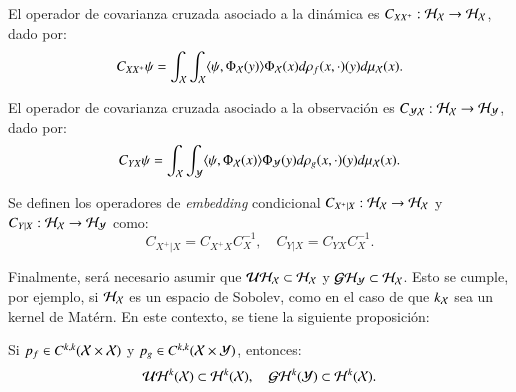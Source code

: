 \begin{defn}
    El operador de covarianza cruzada asociado a la dinámica es $C_{X X^+} : \mathcal{H}_{\mathcal{X}} \to \mathcal{H}_{\mathcal{X}}$, dado por:
	\begin{equation*}
		C_{X X^+} \psi = \int_{\mathcal{X}} \int_{\mathcal{X}} \langle \psi, \Phi_{\mathcal{X}} (y) \rangle \Phi_{\mathcal{X}} (x) d\rho_f (x, \cdot)(y) d \mu_{\mathcal{X}} (x).
	\end{equation*}
    
    El operador de covarianza cruzada asociado a la observación es $C_{\mathcal{Y} \mathcal{X}} : \mathcal{H}_{\mathcal{X}} \to \mathcal{H}_{\mathcal{Y}}$, dado por:
	\begin{equation*}
		C_{Y X} \psi = \int_{\mathcal{X}} \int_{\mathcal{Y}} \langle \psi, \Phi_{\mathcal{X}} (x) \rangle \Phi_{\mathcal{Y}} (y) d\rho_g (x, \cdot)(y) d \mu_{\mathcal{X}} (x).
	\end{equation*}
\end{defn}

\begin{defn}   
    Se definen los operadores de \textit{embedding} condicional $C_{X^+ | X} : \mathcal{H}_{\mathcal{X}} \to \mathcal{H}_{\mathcal{X}}$ y $C_{Y | X} : \mathcal{H}_{\mathcal{X}} \to \mathcal{H}_{\mathcal{Y}}$ como:
	\begin{equation*}
		C_{X^+ | X} = C_{X^+ X} C_X^{-1}, \quad C_{Y | X} = C_{Y X} C_X^{-1}.
	\end{equation*}
\end{defn}

Finalmente, será necesario asumir que $\mathcal{U} \mathcal{H}_{\mathcal{X}} \subset \mathcal{H}_{\mathcal{X}}$ y $\mathcal{G} \mathcal{H}_{\mathcal{Y}} \subset \mathcal{H}_{\mathcal{X}}$. Esto se cumple, por ejemplo, si $\mathcal{H}_{\mathcal{X}}$ es un espacio de Sobolev, como en el caso de que $k_{\mathcal{X}}$ sea un kernel de Matérn. En este contexto, se tiene la siguiente proposición:

\begin{prop}
	Si $p_f \in C^{k,k} (\mathcal{X} \times \mathcal{X})$ y $p_g \in C^{k,k} (\mathcal{X} \times \mathcal{Y})$, entonces:
	\begin{equation*}
		\mathcal{U} \mathcal{H}^k (\mathcal{X}) \subset \mathcal{H}^k (\mathcal{X}), \quad \mathcal{G} \mathcal{H}^k (\mathcal{Y}) \subset \mathcal{H}^k (\mathcal{X}).
	\end{equation*}
    \label{prop:inv_koop}
\end{prop}

